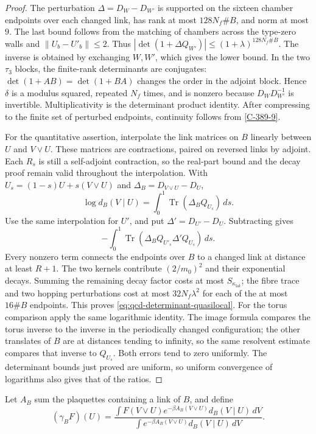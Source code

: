 \documentclass[11pt,letterpaper,reqno]{amsart}
\theoremstyle{definition}
\theoremstyle{remark}
\begin{document}
\begin{proof}
The perturbation $\Delta=D_W-D_{W'}$ is supported on the
sixteen chamber endpoints over each changed link, has rank at
most $128N_f\#B$, and norm at most $9$. The last bound follows
from the matching of chambers across the type-zero walls and
$\|U_b-U'_b\|\le2$. Thus
$|\det(1+\Delta Q_{W'})|\le(1+\lambda)^{128N_f\#B}$.
The inverse is obtained by exchanging $W,W'$, which gives the
lower bound. In the two $\tau_3$ blocks, the finite-rank determinants
are conjugates: $\det(1+AB)=\det(1+BA)$ changes the order in
the adjoint block. Hence $\delta$ is a modulus squared, repeated
$N_f$ times, and is nonzero because $D_WD_{W'}^{-1}$ is
invertible. Multiplicativity is the determinant product identity.
After compressing to the finite set of perturbed endpoints,
continuity follows from \cref{C-389-9}.

For the quantitative assertion, interpolate the link matrices on
$B$ linearly between $U$ and $V\vee U$. These matrices are
contractions, paired on reversed links by adjoint. Each $R_s$
is still a self-adjoint contraction, so the real-part bound and the
decay proof remain valid throughout the interpolation. With
$U_s=(1-s)U+s(V\vee U)$ and $\Delta_B=D_{V\vee U}-D_U$,
\[
 \log d_B(V\mid U)=\int_0^1\operatorname{Tr}(\Delta_BQ_{U_s})\,ds.
\]
Use the same interpolation for $U'$, and put $\Delta'=D_{U'}-D_U$.
Subtracting gives
\[
 -\int_0^1\operatorname{Tr}
                    (\Delta_BQ_{U'_s}\Delta'Q_{U_s})\,ds.
\]
Every nonzero term connects the endpoints over $B$ to a changed
link at distance at least $R+1$. The two kernels contribute
$(2/m_0)^2$ and their exponential decays. Summing the remaining
decay factor costs at most $S_{\kappa_{\mathrm{lat}}}$; the fibre trace and two
hopping perturbations cost at most $32N_f\lambda^2$ for each
of the at most $16\#B$ endpoints. This proves
\eqref{eq:qcd-determinant-quasilocal}.
For the torus comparison apply the same logarithmic identity.
The image formula compares the torus inverse to the inverse in
the periodically changed configuration; the other translates of
$B$ are at distances tending to infinity, so the same resolvent
estimate compares that inverse to $Q_{U_s}$. Both errors tend
to zero uniformly. The determinant bounds just proved are uniform,
so uniform convergence of logarithms also gives that of the ratios.
\end{proof}

Let $A_B$ sum the plaquettes containing a link of $B$, and define
\begin{equation}\label{C-386-10}
 (\gamma_BF)(U)=
 \frac{\int F(V\vee U)e^{-\beta A_B(V\vee U)}d_B(V\mid U)\,dV}
 {\int e^{-\beta A_B(V\vee U)}d_B(V\mid U)\,dV}.
\end{equation}
\end{document}
